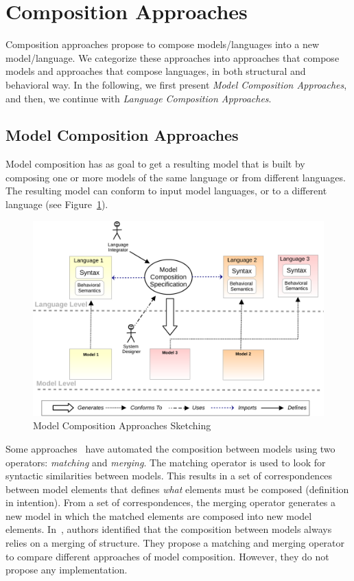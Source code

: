 \section{Composition Approaches}
Composition approaches propose to compose models/languages into a new model/language. We categorize these approaches into approaches that compose models and approaches that compose languages, in both structural and behavioral way. In the following, we first present \emph{Model Composition Approaches}, and then, we continue with \emph{Language Composition Approaches}.
 
\subsection{Model Composition Approaches}
Model composition has as goal to get a resulting model that is built by composing one or more models of the same language or from different languages. The resulting model can conform to input model languages, or to a different language (see Figure~\ref{fig:modelcompo}).

\begin{figure}
	\begin{center}
		\includegraphics[width=.8\textwidth]{background/figs/modelcompo}
		\caption{Model Composition Approaches Sketching}
		\label{fig:modelcompo}
	\end{center}
\end{figure}

Some approaches~\cite{mergemanifest,epsilon,kompose} have automated the composition between models using two operators: \emph{matching} and \emph{merging}. The matching operator is used to look for syntactic similarities between models. This results in a set of correspondences between model elements that defines \emph{what} elements must be composed (definition in intention). From a set of correspondences, the merging operator generates a new model in which the matched elements are composed into new model elements. In~\cite{mergemanifest}, authors identified that the composition between models always relies on a merging of structure. They propose a matching and merging operator to compare different approaches of model composition. However, they do not propose any implementation.

